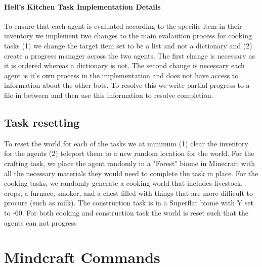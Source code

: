 \documentclass{article}
\begin{document}
\paragraph{Hell's Kitchen Task Implementation Details} To ensure that each agent is evaluated according to the specific item in their inventory we implement two changes to the main evalaution process for cooking tasks (1) we change the target item set to be a list and not a dictionary and (2) create a progress manager across the two agents. The first change is necessary as it is ordered whereas a dictionary is not. The second change is necessary each agent is it's own process in the implementation and does not have access to information about the other bots. To resolve this we write partial progress to a file in between and then use this information to resolve completion. 

\subsection{Task resetting}

To reset the world for each of the tasks we at minimum (1) clear the inventory for the agents (2) teleport them to a new random location for the world. For the crafting task, we place the agent randomly in a "Forest" biome in Minecraft with all the necessary materials they would need to complete the task in place. For the cooking tasks, we randomly generate a cooking world that includes livestock, crops, a furnace, smoker, and a chest filled with things that are more difficult to procure (such as milk). The construction task is in a Superflat biome with Y set to -60. For both cooking and construction task the world is reset such that the agents can not progress 

\section{Mindcraft Commands} \label{appendix: mindcraft-commands}
\end{document}
